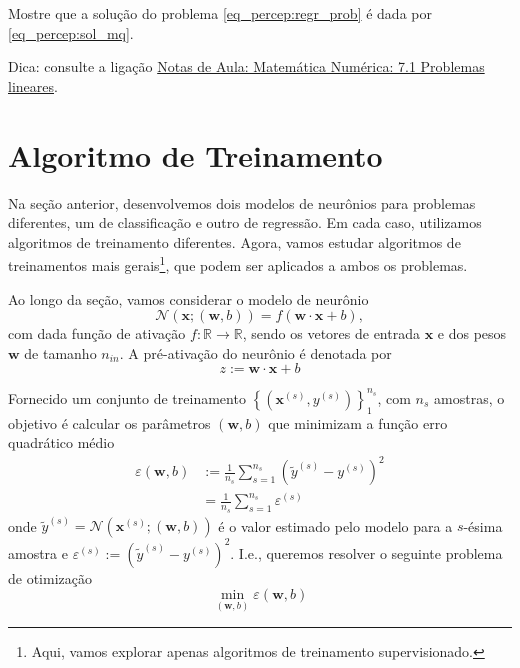 \begin{exer}\label{exer_percep:sol_mq}
  Mostre que a solução do problema \eqref{eq_percep:regr_prob} é dada por \eqref{eq_percep:sol_mq}.
\end{exer}
\begin{resp}
  Dica: consulte a ligação \href{https://notaspedrok.com.br/notas/MatematicaNumerica/cap_ajuste_sec_prob_lin.html}{Notas de Aula: Matemática Numérica: 7.1 Problemas lineares}.
\end{resp}

\emconstrucao

\section{Algoritmo de Treinamento}

Na seção anterior, desenvolvemos dois modelos de neurônios para problemas diferentes, um de classificação e outro de regressão. Em cada caso, utilizamos algoritmos de treinamento diferentes. Agora, vamos estudar algoritmos de treinamentos mais gerais\footnote{Aqui, vamos explorar apenas algoritmos de treinamento supervisionado.}, que podem ser aplicados a ambos os problemas.

Ao longo da seção, vamos considerar o modelo de neurônio
\begin{equation}
  \mathcal{N}\left(\pmb{x}; (\pmb{w}, b)\right) = f(\pmb{w}\cdot\pmb{x} + b),
\end{equation}
com dada função de ativação $f:\mathbb{R}\to\mathbb{R}$, sendo os vetores de entrada $\pmb{x}$ e dos pesos $\pmb{w}$ de tamanho $n_{in}$. A pré-ativação do neurônio é denotada por
\begin{equation}
  z := \pmb{w}\cdot\pmb{x} + b
\end{equation}

Fornecido um conjunto de treinamento $\left\{\left(\pmb{x}^{(s)}, y^{(s)}\right)\right\}_1^{n_s}$, com $n_s$ amostras, o objetivo é calcular os parâmetros $(\pmb{w}, b)$ que minimizam a função erro quadrático médio
\begin{align}\label{eq:percep_mse}
  \varepsilon(\pmb{w}, b) &:= \frac{1}{n_s}\sum_{s=1}^{n_s}\left(\tilde{y}^{(s)} - y^{(s)}\right)^2\\
                          &= \frac{1}{n_s}\sum_{s=1}^{n_s}\varepsilon^{(s)}
\end{align}
onde $\tilde{y}^{(s)} = \mathcal{N}\left(\pmb{x}^{(s)}; (\pmb{w}, b)\right)$ é o valor estimado pelo modelo para a $s$-ésima amostra e $\varepsilon^{(s)} := \left(\tilde{y}^{(s)} - y^{(s)}\right)^2$. I.e., queremos resolver o seguinte problema de otimização
\begin{equation}
  \min_{(\pmb{w}, b)}\varepsilon(\pmb{w}, b)
\end{equation}

